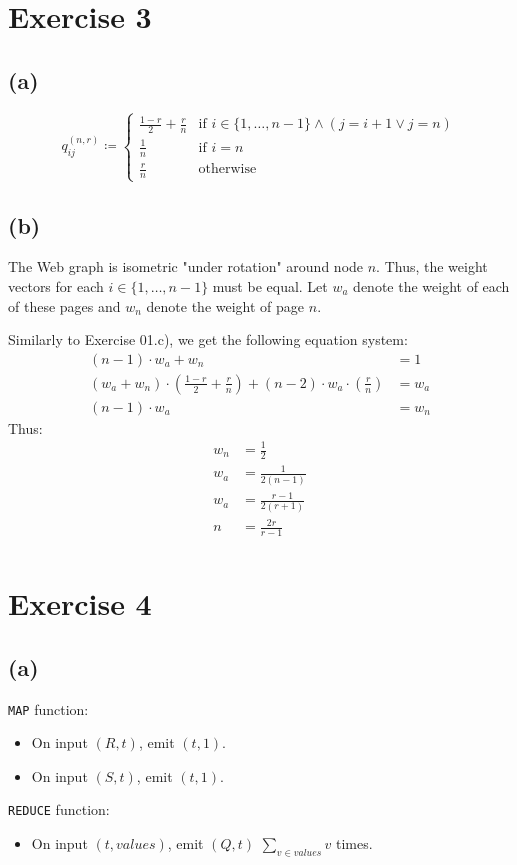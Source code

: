 \documentclass[12pt]{article}
\begin{document}
\section*{Exercise 3}
\subsection*{(a)}
\begin{equation*}
	q_{ij}^{(n,r)} \coloneqq
	\begin{cases}
		\frac{1-r}{2} + \frac{r}{n} & \text{if } i \in \{1, \dots, n-1\} \land (j = i+1 \lor j=n) \\
		\frac{1}{n} & \text{if } i=n \\
		\frac{r}{n} & \text{otherwise}
	\end{cases}
\end{equation*}

\subsection*{(b)}
The Web graph is isometric "under rotation" around node $n$. Thus, the weight vectors for each $i \in \{1, \dots, n-1\}$ must be equal.
Let $w_a$ denote the weight of each of these pages and $w_n$ denote the weight of page $n$.

Similarly to Exercise 01.c), we get the following equation system:
\begin{align*}
	(n-1) \cdot w_a + w_n &= 1 \\
	(w_a + w_n) \cdot (\frac{1-r}{2} + \frac{r}{n}) + (n-2) \cdot w_a \cdot (\frac{r}{n}) &= w_a \\
	(n-1) \cdot w_a &= w_n
\end{align*}
Thus:
\begin{align*}
	w_n &= \frac{1}{2} \\
	w_a &= \frac{1}{2(n-1)} \\
	w_a &= \frac{r-1}{2(r+1)} \\
	n &= \frac{2r}{r-1} \\
\end{align*}

\section*{Exercise 4}
\subsection*{(a)}
\verb|MAP| function:
\begin{itemize}
	\item	On input $(R, t)$, emit $(t,1)$.
	\item	On input $(S, t)$, emit $(t,1)$.
\end{itemize}
\verb|REDUCE| function:
\begin{itemize}
	\item	On input $(t, values)$, emit $(Q,t)$ $\sum_{v \in values} v$ times.
\end{itemize}
\end{document}
